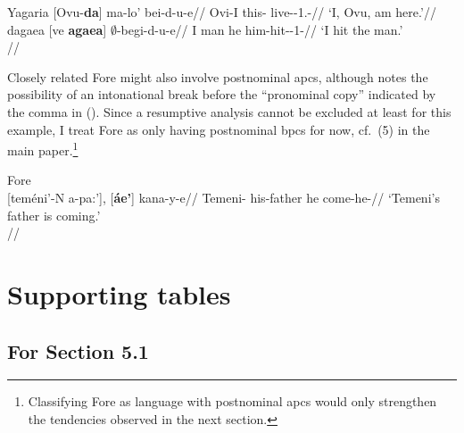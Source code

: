 \documentclass[A4paper]{article}
\begin{document}
\pex Yagaria
\a
\begingl
\gla {}[Ovu-\textbf{da}] ma-lo' bei-d-u-e//
\glb \phantom{[}Ovi-I this-\Loc{} live-\Pst{}-1.\Sg{}-\Ind{}//
\glft `I, Ovu, am here.'//
\endgl
\a
\begingl
\gla dagaea [ve \textbf{agaea}] $\emptyset$-begi-d-u-e//
\glb I \phantom{[}man he him-hit-\Pst{}-1\Sg{}-\Ind{}//
\glft `I hit the man.' \\{\citep[18f.]{renck1975}}//
\endgl
\xe

Closely related Fore might also involve postnominal \glspl{apc}, although \citet[100]{scott1978} notes the possibility of an intonational break before the ``pronominal copy'' indicated by the comma in (\nextx). Since a resumptive analysis cannot be excluded at least for this example, I treat Fore as only having postnominal \glspl{bpc} for now, cf.\ (5) in the main paper.\footnote{Classifying Fore as language with postnominal \glspl{apc} would only strengthen the tendencies observed in the next section.}

\ex Fore\\
\begingl
\gla {}[teméni'-N a-pa:'], [\textbf{áe'}] kana-y-e//
\glb Temeni-\Obl{} his-father he come-he-\Ind{}//
\glft `Temeni's father is coming.'\\{\citep[after][100, (163a)]{scott1978}}//
\endgl
\xe

\clearpage


\section{Supporting tables}


\subsection{For Section 5.1}
\end{document}
